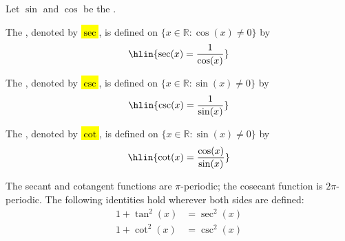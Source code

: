 \begin{definition} \label{definition:secant_cosecant_and_cotangent_functions_on_real_line}
Let $\sin$ and $\cos$ be the .

The , denoted by \hl{$\sec$}, is defined on $\{x \in \mathbb{R} : \cos(x) \neq 0\}$ by
$$\hlin{\sec(x) = \frac{1}{\cos(x)}}$$

The , denoted by \hl{$\csc$}, is defined on $\{x \in \mathbb{R} : \sin(x) \neq 0\}$ by
$$\hlin{\csc(x) = \frac{1}{\sin(x)}}$$

The , denoted by \hl{$\cot$}, is defined on $\{x \in \mathbb{R} : \sin(x) \neq 0\}$ by
$$\hlin{\cot(x) = \frac{\cos(x)}{\sin(x)}}$$

The secant and cotangent functions are $\pi$-periodic; the cosecant function is $2\pi$-periodic. The following identities hold wherever both sides are defined:
\begin{align*}
    1 + \tan^2(x) &= \sec^2(x) \\
    1 + \cot^2(x) &= \csc^2(x)
\end{align*}
\end{definition}
